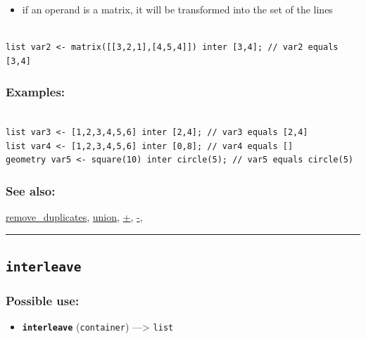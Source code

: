 \documentclass[]{book}
\providecommand{\tightlist}{%
  \setlength{\itemsep}{0pt}\setlength{\parskip}{0pt}}
\theoremstyle{definition}
\theoremstyle{definition}
\theoremstyle{definition}
\theoremstyle{remark}
\begin{document}
\begin{itemize}
\tightlist
\item
  if an operand is a matrix, it will be transformed into the set of the
  lines
\end{itemize}

\begin{verbatim}
 
list var2 <- matrix([[3,2,1],[4,5,4]]) inter [3,4]; // var2 equals [3,4]
\end{verbatim}

\subsubsection{Examples:}\label{examples-210}

\begin{verbatim}
 
list var3 <- [1,2,3,4,5,6] inter [2,4]; // var3 equals [2,4] 
list var4 <- [1,2,3,4,5,6] inter [0,8]; // var4 equals [] 
geometry var5 <- square(10) inter circle(5); // var5 equals circle(5)
\end{verbatim}

\subsubsection{See also:}\label{see-also-119}

\href{operators-n-to-r.html\#remove_duplicates}{remove\_duplicates},
\href{operators-s-to-z.html\#union}{union},
\href{operators-a-to-a.html\#+}{+}, \href{operators-a-to-a.html\#-}{-},

\begin{center}\rule{0.5\linewidth}{\linethickness}\end{center}

\subsection{\texorpdfstring{\texttt{interleave}}{interleave}}\label{interleave}

\subsubsection{Possible use:}\label{possible-use-278}

\begin{itemize}
\tightlist
\item
  \textbf{\texttt{interleave}} (\texttt{container}) ---\textgreater{}
  \texttt{list}
\end{itemize}
\end{document}
